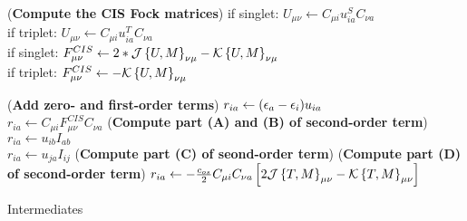 \begin{algorithm}
\Substep(\textbf{Compute the CIS Fock matrices}){
if singlet: $U_{\mu\nu} \leftarrow C_{\mu i} u^S_{ia} C_{\nu a}$
\\
if triplet: $U_{\mu\nu} \leftarrow C_{\mu i} u^T_{ia} C_{\nu a}$
\\
if singlet: $F^{CIS}_{\mu\nu} \leftarrow 2 * \mathcal{J}\left\lbrace U,M \right\rbrace_{\nu\mu} - \mathcal{K}\left\lbrace U,M \right\rbrace_{\nu\mu}$
\\
if triplet: $F^{CIS}_{\mu\nu} \leftarrow - \mathcal{K}\left\lbrace U,M \right\rbrace_{\nu\mu}$
}

\Substep(\textbf{Add zero- and first-order terms}){
$r_{ia} \leftarrow (\epsilon_a - \epsilon_i) u_{ia}$
\\
$r_{ia} \leftarrow C_{\mu i} F^{CIS}_{\mu\nu} C_{\nu a}$
}
%
\Substep(\textbf{Compute part (A) and (B) of second-order term}){
$r_{ia} \leftarrow u_{ib} I_{ab}$
\\
$r_{ia} \leftarrow u_{ja} I_{ij}$
}
%
\Substep(\textbf{Compute part (C) of seond-order term}){
} %
%
\Substep(\textbf{Compute part (D) of second-order term}){
%
$r_{ia} \leftarrow -\frac{c_{os}}{2} C_{\mu i} C_{\nu a} \left[ 2\mathcal{J}\left\lbrace T,M \right\rbrace_{\mu\nu} - \mathcal{K}\left\lbrace T,M \right\rbrace_{\mu\nu} \right]$
} %
\caption{Intermediates}
\label{AODFSOSADC21D}
\end{algorithm}

